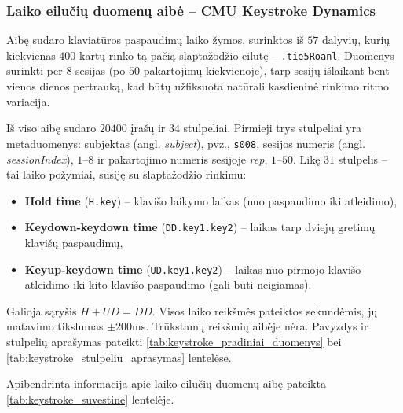\subsubsection{Laiko eilučių duomenų aibė – CMU Keystroke Dynamics}
\label{subsubsec:keystroke_dynamics}

 Aibę \cite{keystroke_dynamics} sudaro klaviatūros paspaudimų laiko žymos, surinktos iš $57$ dalyvių, kurių kiekvienas $400$ kartų rinko tą pačią slaptažodžio eilutę – \texttt{.tie5Roanl}. Duomenys surinkti per $8$ sesijas (po $50$ pakartojimų kiekvienoje), tarp sesijų išlaikant bent vienos dienos pertrauką, kad būtų užfiksuota natūrali kasdieninė rinkimo ritmo variacija.

Iš viso aibę sudaro $20400$ įrašų ir $34$ stulpeliai. Pirmieji trys stulpeliai yra metaduomenys: subjektas (angl. \textit{subject}), pvz., \texttt{s008}, sesijos numeris (angl. \textit{sessionIndex}), $1$–$8$ ir pakartojimo numeris sesijoje \textit{rep}, $1$–$50$. Likę $31$ stulpelis – tai laiko požymiai, susiję su slaptažodžio rinkimu:
\begin{itemize}
    \item \textbf{Hold time} (\texttt{H.key}) – klavišo laikymo laikas (nuo paspaudimo iki atleidimo),
    \item \textbf{Keydown-keydown time} (\texttt{DD.key1.key2}) – laikas tarp dviejų gretimų klavišų paspaudimų,
    \item \textbf{Keyup-keydown time} (\texttt{UD.key1.key2}) – laikas nuo pirmojo klavišo atleidimo iki kito klavišo paspaudimo (gali būti neigiamas).
\end{itemize}
Galioja sąryšis $H + UD = DD$. Visos laiko reikšmės pateiktos sekundėmis, jų matavimo tikslumas $\pm 200$ms. Trūkstamų reikšmių aibėje nėra. Pavyzdys ir stulpelių aprašymas pateikti \ref{tab:keystroke_pradiniai_duomenys} bei \ref{tab:keystroke_stulpeliu_aprasymas} lentelėse.




Apibendrinta informacija apie laiko eilučių duomenų aibę pateikta \ref{tab:keystroke_suvestine} lentelėje.

